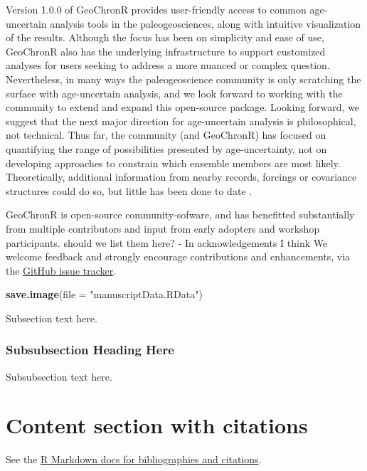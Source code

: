 \documentclass[gc, manuscript]{copernicus}
\newenvironment{Shaded}{\begin{snugshade}}{\end{snugshade}}
\newcommand{\DataTypeTok}[1]{\textcolor[rgb]{0.13,0.29,0.53}{#1}}
\newcommand{\KeywordTok}[1]{\textcolor[rgb]{0.13,0.29,0.53}{\textbf{#1}}}
\newcommand{\NormalTok}[1]{#1}
\newcommand{\StringTok}[1]{\textcolor[rgb]{0.31,0.60,0.02}{#1}}
\begin{document}
\conclusions

Version 1.0.0 of GeoChronR provides user-friendly access to common age-uncertain analysis tools in the paleogeosciences, along with intuitive visualization of the results.
Although the focus has been on simplicity and ease of use, GeoChronR also has the underlying infrastructure to support customized analyses for users seeking to address a more nuanced or complex question.
Nevertheless, in many ways the paleogeoscience community is only scratching the surface with age-uncertain analysis, and we look forward to working with the community to extend and expand this open-source package.
Looking forward, we suggest that the next major direction for age-uncertain analysis is philosophical, not technical.
Thus far, the community (and GeoChronR) has focused on quantifying the range of possibilities presented by age-uncertainty, not on developing approaches to constrain which ensemble members are most likely.
Theoretically, additional information from nearby records, forcings or covariance structures could do so, but little has been done to date \citep{wernerAndTingley}.

GeoChronR is open-source community-sofware, and has benefitted substantially from multiple contributors and input from early adopters and workshop participants.
should we list them here? - In acknowledgements I think
We welcome feedback and strongly encourage contributions and enhancements, via the \href{https://github.com/nickmckay/GeoChronR/issues}{GitHub issue tracker}.

\begin{Shaded}
\begin{Highlighting}[]
\KeywordTok{save.image}\NormalTok{(}\DataTypeTok{file =} \StringTok{"manuscriptData.RData"}\NormalTok{)}
\end{Highlighting}
\end{Shaded}

Subsection text here.

\subsubsection{Subsubsection Heading Here}

Subsubsection text here.

\section{Content section with citations}

See the \href{http://rmarkdown.rstudio.com/authoring_bibliographies_and_citations.html}{R Markdown docs for bibliographies and citations}.
\end{document}
